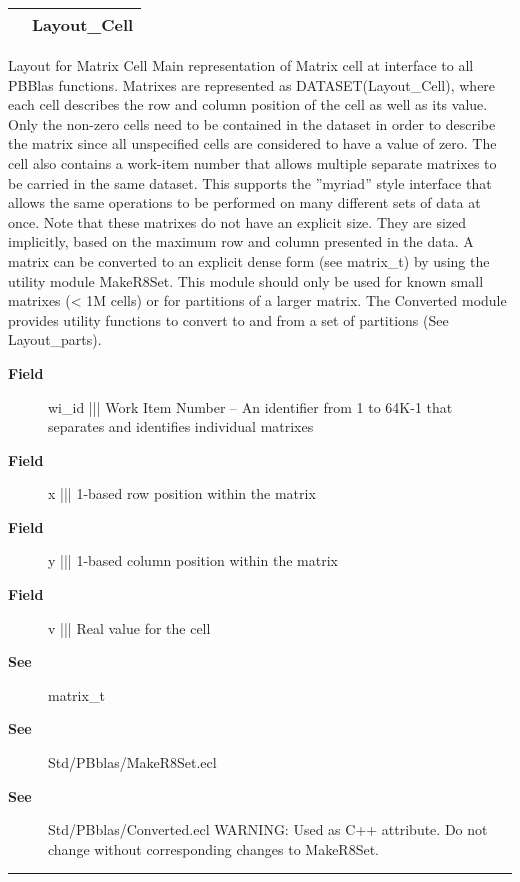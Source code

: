 {\renewcommand{\arraystretch}{1.5}
\begin{tabularx}{\textwidth}{|>{\raggedright\arraybackslash}l|X|}
\hline
\hspace{0pt} & Layout\_Cell \\
\hline
\end{tabularx}
}

\par
Layout for Matrix Cell Main representation of Matrix cell at interface to all PBBlas functions. Matrixes are represented as DATASET(Layout\_Cell), where each cell describes the row and column position of the cell as well as its value. Only the non-zero cells need to be contained in the dataset in order to describe the matrix since all unspecified cells are considered to have a value of zero. The cell also contains a work-item number that allows multiple separate matrixes to be carried in the same dataset. This supports the ''myriad'' style interface that allows the same operations to be performed on many different sets of data at once. Note that these matrixes do not have an explicit size. They are sized implicitly, based on the maximum row and column presented in the data. A matrix can be converted to an explicit dense form (see matrix\_t) by using the utility module MakeR8Set. This module should only be used for known small matrixes (< 1M cells) or for partitions of a larger matrix. The Converted module provides utility functions to convert to and from a set of partitions (See Layout\_parts).

\par
\begin{description}
\item [\textbf{Field}] wi\_id ||| Work Item Number -- An identifier from 1 to 64K-1 that separates and identifies individual matrixes
\item [\textbf{Field}] x ||| 1-based row position within the matrix
\item [\textbf{Field}] y ||| 1-based column position within the matrix
\item [\textbf{Field}] v ||| Real value for the cell
\item [\textbf{See}] matrix\_t
\item [\textbf{See}] Std/PBblas/MakeR8Set.ecl
\item [\textbf{See}] Std/PBblas/Converted.ecl WARNING: Used as C++ attribute. Do not change without corresponding changes to MakeR8Set.
\end{description}

\rule{\linewidth}{0.5pt}
